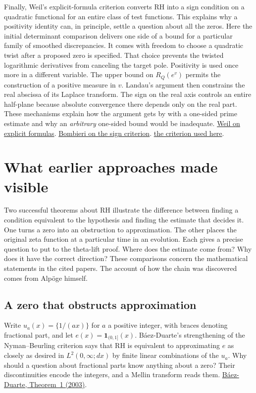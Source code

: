 \documentclass[11pt,letterpaper]{article}
\newcommand{\sref}[2]{\href{https://github.com/VladimirReshetnikov/ProveIt/blob/d8415e76ad850651f8c0083afe689dd9f4a45a10/Analysis/GeneralizedRiemannHypothesis/vendor/grh-lean/grh/src/#1.lean}{#2}}
\begin{document}
Finally, Weil's explicit-formula criterion converts RH into a sign condition on a quadratic functional for an entire class of test functions. This explains why a positivity identity can, in principle, settle a question about all the zeros. Here the initial determinant comparison delivers one side of a bound for a particular family of smoothed discrepancies. It comes with freedom to choose a quadratic twist after a proposed zero is specified. That choice prevents the twisted logarithmic derivatives from canceling the target pole. Positivity is used once more in a different variable. The upper bound on \(R_Q(e^v)\) permits the construction of a positive measure in \(v\). Landau's argument then constrains the real abscissa of its Laplace transform. The sign on the real axis controls an entire half-plane because absolute convergence there depends only on the real part. These mechanisms explain how the argument gets by with a one-sided prime estimate and why an \emph{arbitrary} one-sided bound would be inadequate. \href{https://doi.org/10.1070/IM1972v006n01ABEH001866}{Weil on explicit formulas}. \href{https://www.claymath.org/library/monographs/MPPc.pdf}{Bombieri on the sign criterion}. \sref{New/Reduction/Zeros/Criterion}{the criterion used here}.


\section{What earlier approaches made visible}
\label{sec:earlier}
Two successful theorems about RH illustrate the difference between finding a condition equivalent to the hypothesis and finding the estimate that decides it. One turns a zero into an obstruction to approximation. The other places the original zeta function at a particular time in an evolution. Each gives a precise question to put to the theta-lift proof. Where does the estimate come from? Why does it have the correct direction? These comparisons concern the mathematical statements in the cited papers. The account of how the chain was discovered comes from Alpöge himself.

\subsection{A zero that obstructs approximation}

Write \(u_a(x)=\{1/(ax)\}\) for \(a\) a positive integer, with braces denoting fractional part, and let \(e(x)=\mathbf1_{(0,1]}(x)\). Báez-Duarte's strengthening of the Nyman--Beurling criterion says that RH is equivalent to approximating \(e\) as closely as desired in \(L^2(0,\infty;dx)\) by finite linear combinations of the \(u_a\). Why should a question about fractional parts know anything about a zero? Their discontinuities encode the integers, and a Mellin transform reads them. \href{https://arxiv.org/abs/math/0202141}{Báez-Duarte, Theorem~1 (2003)}.
\end{document}
